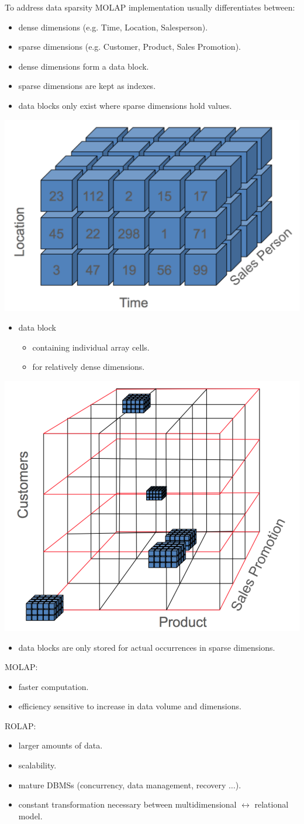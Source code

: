 \begin{breakbox}
\newline To address data sparsity MOLAP implementation usually differentiates between:
\begin{itemize}
	\item dense dimensions (e.g. Time, Location, Salesperson).
	\item sparse dimensions (e.g. Customer, Product, Sales Promotion).
	\item dense dimensions form a data block.
	\item sparse dimensions are kept as indexes.
	\item data blocks only exist where sparse dimensions hold values.
\end{itemize}
\begin{center}
\includegraphics[width=.05\textwidth]{slides_images/dense_molap.png}
\end{center}
\begin{itemize}
	\item data block
	\begin{itemize}
		\item containing individual array cells.
		\item for relatively dense dimensions.
	\end{itemize}
\end{itemize}
\begin{center}
\includegraphics[width=.05\textwidth]{slides_images/sparse_molap.png}
\end{center}
\begin{itemize}
	\item data blocks are only stored for actual occurrences in sparse dimensions.
\end{itemize}
\end{breakbox}

\begin{breakbox}
\newline MOLAP:
\begin{itemize}
	\item faster computation.
	\item efficiency sensitive to increase in data volume and dimensions.
\end{itemize}
ROLAP:
\begin{itemize}
	\item larger amounts of data.
	\item scalability.
	\item mature DBMSs (concurrency, data management, recovery $\ldots$).
	\item constant transformation necessary between multidimensional $\leftrightarrow$ relational model.
\end{itemize}
\end{breakbox}

